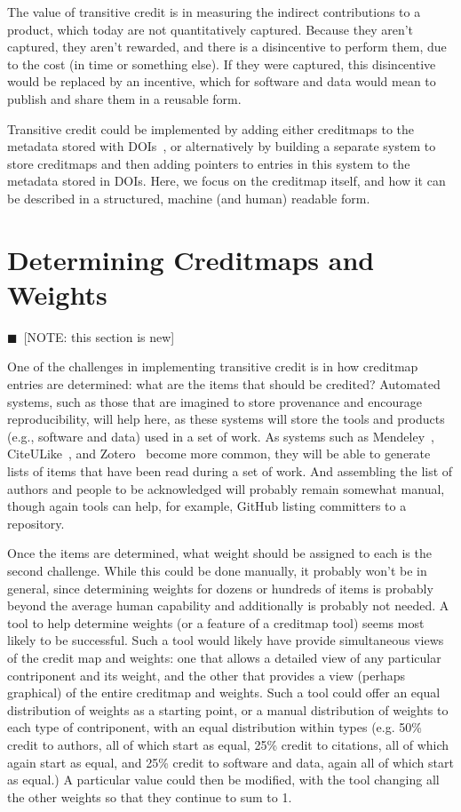 \documentclass[a4paper,10pt]{article}
\newcommand{\note}[1]{{\color{darkgreen}$\blacksquare$~\textsf{[NOTE: #1]}}}
\begin{document}
The value of transitive credit is in measuring the indirect contributions to a product, which today are not quantitatively captured. Because they aren't captured, they aren't rewarded, and there is a disincentive to perform them, due to the cost (in time or something else). If they were captured, this disincentive would be replaced by an incentive, which for software and data would mean to publish and share them in a reusable form.

Transitive credit could be implemented by adding either creditmaps to the metadata stored with DOIs~\cite{DOI-data-model}, or alternatively by building a separate system to store creditmaps and then adding pointers to entries in this system to the metadata stored in DOIs. Here, we focus on the creditmap itself, and how it can be described in a structured, machine (and human) readable form.

\section{Determining Creditmaps and Weights}

\note{this section is new}

One of the challenges in implementing transitive credit is in how creditmap entries are determined: what are the items that should be credited?   Automated systems, such as those that are imagined to store provenance and encourage reproducibility, will help here, as these systems will store the tools and products (e.g., software and data) used in a set of work.  As systems such as Mendeley~\cite{mendeley}, CiteULike~\cite{citeulike}, and Zotero~\cite{zotero} become more common, they will be able to generate lists of items that have been read during a set of work.  And assembling the list of authors and people to be acknowledged will probably remain somewhat manual, though again tools can help, for example, GitHub listing committers to a repository.

Once the items are determined, what weight should be assigned to each is the second challenge.  While this could be done manually, it probably won't be in general, since determining weights for dozens or hundreds of items is probably beyond the average human capability and additionally is probably not needed.  A tool to help determine weights (or a feature of a creditmap tool) seems most likely to be successful.  Such a tool would likely have provide simultaneous views of the credit map and weights: one that allows a detailed view of any particular contriponent and its weight, and the other that provides a view (perhaps graphical) of the entire creditmap and weights. Such a tool could offer an equal distribution of weights as a starting point, or a manual distribution of weights to each type of contriponent, with an equal distribution within types (e.g. 50\% credit to authors, all of which start as equal, 25\% credit to citations, all of which again start as equal, and 25\% credit to software and data, again all of which start as equal.)  A particular value could then be modified, with the tool changing all the other weights so that they continue to sum to 1.
\end{document}
